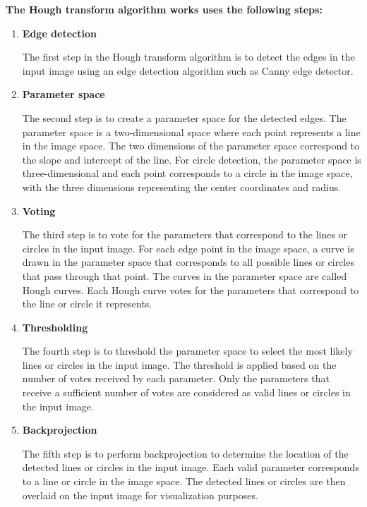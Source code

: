     \textbf{The Hough transform algorithm works uses the following steps:}
    
    \begin{enumerate}
        
        \item \textbf{Edge detection}
        
        The first step in the Hough transform algorithm is to detect the edges in the input image using an edge detection algorithm such as Canny edge detector.
        
        \item \textbf{Parameter space}
        
        The second step is to create a parameter space for the detected edges. 
        The parameter space is a two-dimensional space where each point represents a line in the image space. 
        The two dimensions of the parameter space correspond to the slope and intercept of the line. For circle detection, the parameter space is three-dimensional and each point corresponds to a circle in the image space, with the three dimensions representing the center coordinates and radius.
        
        \item \textbf{Voting}
        
        The third step is to vote for the parameters that correspond to the lines or circles in the input image. 
        For each edge point in the image space, a curve is drawn in the parameter space that corresponds to all possible lines or circles that pass through that point. 
        The curves in the parameter space are called Hough curves. Each Hough curve votes for the parameters that correspond to the line or circle it represents.
        
        \item \textbf{Thresholding}
        
        The fourth step is to threshold the parameter space to select the most likely lines or circles in the input image. 
        The threshold is applied based on the number of votes received by each parameter. 
        Only the parameters that receive a sufficient number of votes are considered as valid lines or circles in the input image.
        
        \item \textbf{Backprojection}
        
        The fifth step is to perform backprojection to determine the location of the detected lines or circles in the input image. 
        Each valid parameter corresponds to a line or circle in the image space. The detected lines or circles are then overlaid on the input image for visualization purposes.
        
    \end{enumerate}
        

